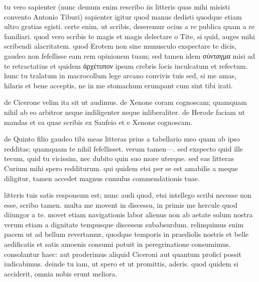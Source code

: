 


 tu vero sapienter (nunc demum enim rescribo iis litteris quas mihi misisti convento Antonio Tiburi) sapienter igitur quod manus dedisti quodque etiam ultro gratias egisti. certe enim, ut scribis, deseremur ocius a re publica quam a re familiari. quod vero scribis te magis et magis delectare o Tite, si quid, auges mihi scribendi alacritatem. quod Erotem non sine munusculo exspectare te dicis, gaudeo non fefellisse eam rem opinionem tuam; sed tamen idem σύνταγμα misi ad te retractatius et quidem ἀρχέτυπον ipsum crebris locis inculcatum et refectum. hunc tu tralatum in macrocollum lege arcano convivis tuis sed, si me amas, hilaris et bene acceptis, ne in me stomachum erumpant cum sint tibi irati.

 de Cicerone velim ita sit ut audimus. de Xenone coram cognoscam; quamquam nihil ab eo arbitror neque indiligenter neque inliberaliter. de Herode faciam ut mandas et ea quae scribis ex Saufeio et e Xenone cognoscam.

 de Quinto filio gaudeo tibi meas litteras prius a tabellario meo quam ab ipso redditas; quamquam te nihil fefellisset. verum tamen—. sed exspecto quid ille tecum, quid tu vicissim, nec dubito quin suo more uterque. sed eas litteras Curium mihi spero redditurum. qui quidem etsi per se est amabilis a meque diligitur, tamen accedet magnus cumulus commendationis tuae.

 litteris tuis satis responsum est; nunc audi quod, etsi intellego scribi necesse non esse, scribo tamen. multa me movent in discessu, in primis me hercule quod diiungor a te. movet etiam navigationis labor alienus non ab aetate solum nostra verum etiam a dignitate tempusque discessus subabsurdum. relinquimus enim pacem ut ad bellum revertamur, quodque temporis in praediolis nostris et belle aedificatis et satis amoenis consumi potuit in peregrinatione consumimus. consolantur haec: aut proderimus aliquid Ciceroni aut quantum profici possit iudicabimus. deinde tu iam, ut spero et ut promittis, aderis. quod quidem si acciderit, omnia nobis erunt meliora.

